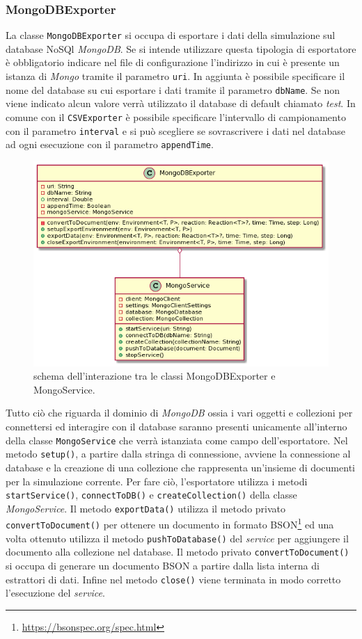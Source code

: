 \documentclass[12pt,a4paper,openright,oneside]{book}
\begin{document}
\subsubsection{MongoDBExporter}
    La classe \texttt{MongoDBExporter} si occupa di esportare i dati della simulazione sul database NoSQl \textit{MongoDB}.
    Se si intende utilizzare questa tipologia di esportatore è obbligatorio indicare nel file di configurazione l'indirizzo in cui è presente un istanza di \textit{Mongo} tramite il parametro \texttt{uri}.
    In aggiunta è possibile specificare il nome del database su cui esportare i dati tramite il parametro \texttt{dbName}. Se non viene indicato alcun valore verrà utilizzato il database di default chiamato \textit{test}.
    In comune con il \texttt{CSVExporter} è possibile specificare l'intervallo di campionamento con il parametro \texttt{interval} e si può scegliere se sovrascrivere i dati nel database ad ogni esecuzione con il parametro \texttt{appendTime}.
    \begin{figure}
    	\centering
    	\includegraphics[width=1\linewidth]{images/mongodbexporter.png}
    	\caption{schema dell'interazione tra le classi MongoDBExporter e MongoService.}
    	\label{fig:mongo-exporter}
    \end{figure}
    Tutto ciò che riguarda il dominio di \textit{MongoDB} ossia i vari oggetti e collezioni per connettersi ed interagire con il database saranno presenti unicamente all'interno della classe \texttt{MongoService} che verrà istanziata come campo dell'esportatore.
    Nel metodo \texttt{setup()}, a partire dalla stringa di connessione, avviene la connessione al database e la creazione di una collezione che rappresenta un'insieme di documenti per la simulazione corrente. Per fare ciò, l'esportatore utilizza i metodi \texttt{startService()}, \texttt{connectToDB()} e \texttt{createCollection()} della classe \textit{MongoService}.
    Il metodo \texttt{exportData()} utilizza il metodo privato \texttt{convertToDocument()} per ottenere un documento in formato BSON\footnote{\url{https://bsonspec.org/spec.html}} ed una volta ottenuto utilizza il metodo \texttt{pushToDatabase()} del \textit{service} per aggiungere il documento alla collezione nel database.
    Il metodo privato \texttt{convertToDocument()} si occupa di generare un documento BSON a partire dalla lista interna di estrattori di dati.
    Infine nel metodo \texttt{close()} viene terminata in modo corretto l'esecuzione del \textit{service}.
\end{document}

